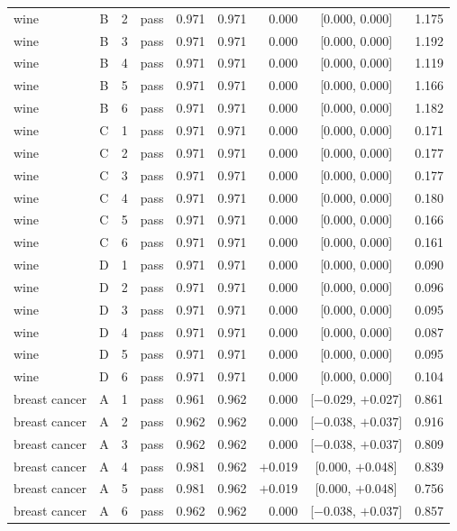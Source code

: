 {\begin{longtable}{lccl rrrcr}
wine & B & 2 & pass & 0.971 & 0.971 & 0.000 & [0.000, 0.000] & 1.175 \\
wine & B & 3 & pass & 0.971 & 0.971 & 0.000 & [0.000, 0.000] & 1.192 \\
wine & B & 4 & pass & 0.971 & 0.971 & 0.000 & [0.000, 0.000] & 1.119 \\
wine & B & 5 & pass & 0.971 & 0.971 & 0.000 & [0.000, 0.000] & 1.166 \\
wine & B & 6 & pass & 0.971 & 0.971 & 0.000 & [0.000, 0.000] & 1.182 \\
\addlinespace[2pt]
wine & C & 1 & pass & 0.971 & 0.971 & 0.000 & [0.000, 0.000] & 0.171 \\
wine & C & 2 & pass & 0.971 & 0.971 & 0.000 & [0.000, 0.000] & 0.177 \\
wine & C & 3 & pass & 0.971 & 0.971 & 0.000 & [0.000, 0.000] & 0.177 \\
wine & C & 4 & pass & 0.971 & 0.971 & 0.000 & [0.000, 0.000] & 0.180 \\
wine & C & 5 & pass & 0.971 & 0.971 & 0.000 & [0.000, 0.000] & 0.166 \\
wine & C & 6 & pass & 0.971 & 0.971 & 0.000 & [0.000, 0.000] & 0.161 \\
\addlinespace[2pt]
wine & D & 1 & pass & 0.971 & 0.971 & 0.000 & [0.000, 0.000] & 0.090 \\
wine & D & 2 & pass & 0.971 & 0.971 & 0.000 & [0.000, 0.000] & 0.096 \\
wine & D & 3 & pass & 0.971 & 0.971 & 0.000 & [0.000, 0.000] & 0.095 \\
wine & D & 4 & pass & 0.971 & 0.971 & 0.000 & [0.000, 0.000] & 0.087 \\
wine & D & 5 & pass & 0.971 & 0.971 & 0.000 & [0.000, 0.000] & 0.095 \\
wine & D & 6 & pass & 0.971 & 0.971 & 0.000 & [0.000, 0.000] & 0.104 \\
\midrule
breast cancer & A & 1 & pass & 0.961 & 0.962 & 0.000 & [$-$0.029, $+$0.027] & 0.861 \\
breast cancer & A & 2 & pass & 0.962 & 0.962 & 0.000 & [$-$0.038, $+$0.037] & 0.916 \\
breast cancer & A & 3 & pass & 0.962 & 0.962 & 0.000 & [$-$0.038, $+$0.037] & 0.809 \\
breast cancer & A & 4 & pass & 0.981 & 0.962 & $+$0.019 & [0.000, $+$0.048] & 0.839 \\
breast cancer & A & 5 & pass & 0.981 & 0.962 & $+$0.019 & [0.000, $+$0.048] & 0.756 \\
breast cancer & A & 6 & pass & 0.962 & 0.962 & 0.000 & [$-$0.038, $+$0.037] & 0.857 \\

\end{longtable}}

